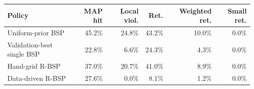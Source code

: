 \begin{tabular}{lrrrrr}
\toprule
Policy & MAP hit & Local viol. & Ret. & Weighted ret. & Small ret. \\
\midrule
Uniform-prior BSP & 45.2\% & 24.8\% & 43.2\% & 10.0\% & 0.0\% \\
Validation-best single BSP & 22.8\% & 6.6\% & 24.3\% & 4.3\% & 0.0\% \\
Hand-grid R-BSP & 37.0\% & 20.7\% & 41.0\% & 8.9\% & 0.0\% \\
Data-driven R-BSP & 27.6\% & 0.0\% & 8.1\% & 1.2\% & 0.0\% \\
\bottomrule
\end{tabular}
